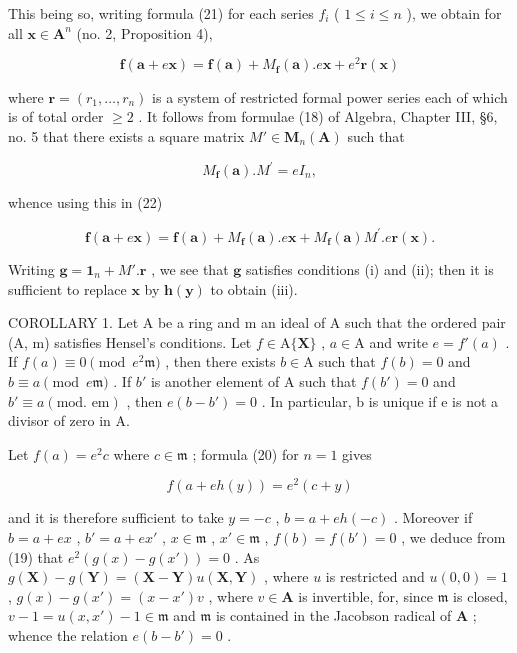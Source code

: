This being so, writing formula (21) for each series \(f_{i}\) ( \(1 \leqslant i \leqslant n\) ), we obtain for all \(\mathbf{x} \in \mathbf{A}^n\) (no. 2, Proposition 4),

\[
\mathbf {f} (\mathbf {a} + e \mathbf {x}) = \mathbf {f} (\mathbf {a}) + M _ {\mathbf {f}} (\mathbf {a}). e \mathbf {x} + e ^ {2} \mathbf {r} (\mathbf {x})\tag{22}
\]

where \(\mathbf{r} = (r_1, \ldots, r_n)\) is a system of restricted formal power series each of which is of total order \(\geqslant 2\) . It follows from formulae (18) of Algebra, Chapter III, §6, no. 5 that there exists a square matrix \(M' \in \mathbf{M}_n(\mathbf{A})\) such that

\[
M _ {\mathbf {f}} (\mathbf {a}). M ^ {\prime} = e I _ {n},\tag{23}
\]

whence using this in (22)

\[
\mathbf {f} (\mathbf {a} + e \mathbf {x}) = \mathbf {f} (\mathbf {a}) + M _ {\mathbf {f}} (\mathbf {a}). e \mathbf {x} + M _ {\mathbf {f}} (\mathbf {a}) M ^ {\prime}. e \mathbf {r} (\mathbf {x}).\tag{24}
\]

Writing \(\mathbf{g} = \mathbf{1}_n + M'.\mathbf{r}\) , we see that \(\mathbf{g}\) satisfies conditions (i) and (ii); then it is sufficient to replace \(\mathbf{x}\) by \(\mathbf{h}(\mathbf{y})\) to obtain (iii).

COROLLARY 1. Let A be a ring and m an ideal of A such that the ordered pair (A, m) satisfies Hensel's conditions. Let \(f \in \mathrm{A}\{\mathbf{X}\}\) , \(a \in \mathrm{A}\) and write \(e = f'(a)\) . If \(f(a) \equiv 0 \pmod{e^2\mathfrak{m}}\) , then there exists \(b \in \mathrm{A}\) such that \(f(b) = 0\) and \(b \equiv a \pmod{e\mathfrak{m}}\) . If \(b'\) is another element of A such that \(f(b') = 0\) and \(b' \equiv a (\text{mod. em})\) , then \(e(b - b') = 0\) . In particular, b is unique if e is not a divisor of zero in A.

Let \(f(a) = e^{2}c\) where \(c \in \mathfrak{m}\) ; formula (20) for \(n = 1\) gives

\[
f (a + e h (y)) = e ^ {2} (c + y)
\]

and it is therefore sufficient to take \(y = -c\) , \(b = a + eh(-c)\) . Moreover if \(b = a + ex\) , \(b' = a + ex'\) , \(x \in \mathfrak{m}\) , \(x' \in \mathfrak{m}\) , \(f(b) = f(b') = 0\) , we deduce from (19) that \(e^2(g(x) - g(x')) = 0\) . As \(g(\mathbf{X}) - g(\mathbf{Y}) = (\mathbf{X} - \mathbf{Y})u(\mathbf{X}, \mathbf{Y})\) , where \(u\) is restricted and \(u(0,0) = 1\) , \(g(x) - g(x') = (x - x')v\) , where \(v \in \mathbf{A}\) is invertible, for, since \(\mathfrak{m}\) is closed, \(v - 1 = u(x,x') - 1 \in \mathfrak{m}\) and \(\mathfrak{m}\) is contained in the Jacobson radical of \(\mathbf{A}\) ; whence the relation \(e(b - b') = 0\) .


